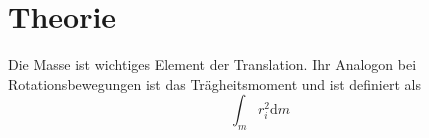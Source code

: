 \section{Theorie} %
\label{sec:theorie}
Die Masse ist wichtiges Element der Translation. 
Ihr Analogon bei Rotationsbewegungen ist das Trägheitsmoment und ist definiert als
\begin{equation}
	\label{1}
	\int_{m} r_i^2\mathup{d}m
\end{equation}
